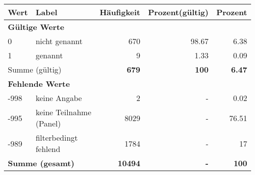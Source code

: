      \begin{longtable}{lXrrr}
     \toprule
     \textbf{Wert} & \textbf{Label} & \textbf{Häufigkeit} & \textbf{Prozent(gültig)} & \textbf{Prozent} \\
     \endhead
     \midrule
     \multicolumn{5}{l}{\textbf{Gültige Werte}}\\

     0 &
     \multicolumn{1}{X}{ nicht genannt   } &


       \num{670} &
       \num[round-mode=places,round-precision=2]{98.67} &
         \num[round-mode=places,round-precision=2]{6.38} \\

     1 &
     \multicolumn{1}{X}{ genannt   } &


       \num{9} &
       \num[round-mode=places,round-precision=2]{1.33} &
         \num[round-mode=places,round-precision=2]{0.09} \\
     \midrule
     \multicolumn{2}{l}{Summe (gültig)} &
       \textbf{\num{679}} &
     \textbf{\num{100}} &
       \textbf{\num[round-mode=places,round-precision=2]{6.47}} \\
     \multicolumn{5}{l}{\textbf{Fehlende Werte}}\\
       -998 &
       keine Angabe &
         \num{2} &
        - &
         \num[round-mode=places,round-precision=2]{0.02} \\
       -995 &
       keine Teilnahme (Panel) &
         \num{8029} &
        - &
         \num[round-mode=places,round-precision=2]{76.51} \\
       -989 &
       filterbedingt fehlend &
         \num{1784} &
        - &
         \num[round-mode=places,round-precision=2]{17} \\
     \midrule
     \multicolumn{2}{l}{\textbf{Summe (gesamt)}} &
          \textbf{\num{10494}} &
        \textbf{-} &
        \textbf{\num{100}} \\
     \bottomrule
     \end{longtable}
     

